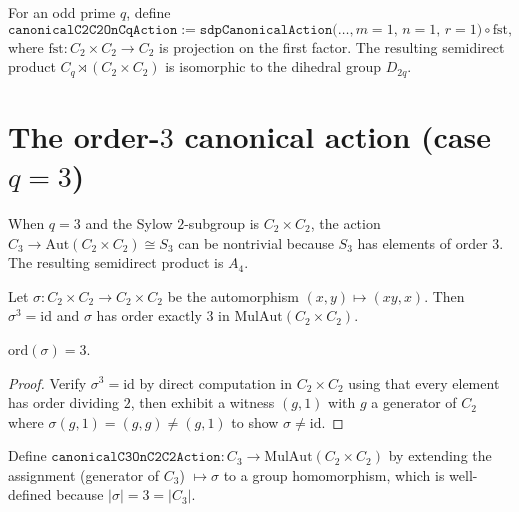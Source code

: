 \begin{definition}
    \label{def:canonicalC2C2OnCq}
    For an odd prime $q$, define
    \[
        \mathtt{canonicalC2C2OnCqAction} :=
            \mathtt{sdpCanonicalAction}\bigl(\dots, m = 1,\, n = 1,\, r = 1\bigr)
            \circ \mathrm{fst},
    \]
    where $\mathrm{fst} : C_2 \times C_2 \to C_2$ is projection on the first
    factor. The resulting semidirect product $C_q \rtimes (C_2 \times C_2)$
    is isomorphic to the dihedral group $D_{2q}$.
\end{definition}

\section{The order-$3$ canonical action (case $q = 3$)}

When $q = 3$ and the Sylow $2$-subgroup is $C_2 \times C_2$, the action
$C_3 \to \mathrm{Aut}(C_2 \times C_2) \cong S_3$ can be nontrivial because
$S_3$ has elements of order $3$. The resulting semidirect product is $A_4$.

\begin{definition}
    \label{def:c2c2OrderThreeAut}
    Let $\sigma : C_2 \times C_2 \to C_2 \times C_2$ be the automorphism
    $(x, y) \mapsto (xy, x)$. Then $\sigma^3 = \mathrm{id}$ and $\sigma$ has
    order exactly $3$ in $\mathrm{MulAut}(C_2 \times C_2)$.
\end{definition}
\begin{lemma}
    \label{lem:orderOf-c2c2OrderThreeAut}
    $\mathrm{ord}(\sigma) = 3$.
\end{lemma}
\begin{proof}
    Verify $\sigma^3 = \mathrm{id}$ by direct computation in $C_2 \times C_2$
    using that every element has order dividing $2$, then exhibit a witness
    $(g, 1)$ with $g$ a generator of $C_2$ where $\sigma(g, 1) = (g, g)
    \neq (g, 1)$ to show $\sigma \neq \mathrm{id}$.
\end{proof}

\begin{definition}
    \label{def:canonicalC3OnC2C2}
    Define $\mathtt{canonicalC3OnC2C2Action} : C_3 \to
    \mathrm{MulAut}(C_2 \times C_2)$ by extending the assignment
    (generator of $C_3$) $\mapsto \sigma$ to a group homomorphism, which is
    well-defined because $|\sigma| = 3 = |C_3|$.
\end{definition}

